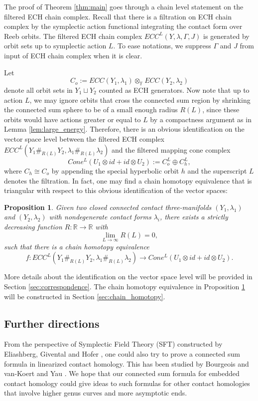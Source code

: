 \documentclass{article}
\numberwithin{equation}{section}
\newtheorem{proposition}[theorem]{Proposition}
\theoremstyle{definition}
\newcommand{\R}{\mathbb{R}}
\newcommand{\F}{\mathbb{F}}
\begin{document}
The proof of Theorem \ref{thm:main} goes through a chain level statement on the filtered ECH chain complex. Recall that there is a filtration on ECH chain complex by the symplectic action functional integrating the contact form over Reeb orbits. The filtered ECH chain complex $ECC^L(Y,\lambda, \Gamma, J)$ is generated by orbit sets up to symplectic action $L$. To ease notations, we suppress $\Gamma$ and $J$ from input of ECH chain complex when it is clear. 

Let
$$C_o:= ECC(Y_1, \lambda_1) \otimes_{\F} ECC(Y_2, \lambda_2)$$ 
denote all orbit sets in $Y_1 \sqcup Y_2$ counted as ECH generators. Now note that up to action $L$, we may ignore orbits that cross the connected sum region by shrinking the connected sum sphere to be of a small enough radius $R(L)$, since these orbits would have actions greater or equal to $L$ by a compactness argument as in Lemma \ref{lem:large_energy}. Therefore, there is an obvious identification on the vector space level between the filtered ECH complex $ECC^L(Y_1 \#_{R(L)} Y_2, \lambda_1\#_{R(L)}\lambda_2)$ and the filtered mapping cone complex 
$$Cone^L(U_1 \otimes id + id \otimes U_2):=C_o^L \oplus C_h^L,$$
where $C_h \cong C_o$ by appending the special hyperbolic orbit $h$ and the superscript $L$ denotes the filtration. In fact, one may find a chain homotopy equivalence that is triangular with respect to this obvious identification of the vector spaces:

\begin{proposition}
\label{prop:main_filtered_intro}
Given two closed connected contact three-manifolds $(Y_1, \lambda_1)$ and $(Y_2, \lambda_2)$ with nondegenerate contact forms $\lambda_i$, there exists a strictly decreasing function $R: \R \to \R$ with $$\lim_{L\to \infty} R(L) = 0,$$
such that there is a chain homotopy equivalence 
$$f: ECC^L(Y_1 \#_{R(L)} Y_2, \lambda_1\#_{R(L)}\lambda_2) \longrightarrow Cone^L(U_1 \otimes id + id \otimes U_2).$$
\end{proposition}


More details about the identification on the vector space level will be provided in Section \ref{sec:correspondence}. The chain homotopy equivalence in Proposition \ref{prop:main_filtered_intro} will be constructed in Section \ref{sec:chain_homotopy}.


\subsection{Further directions}
\label{sec:future}
From the perspective of Symplectic Field Theory (SFT) constructed by Eliashberg, Givental and Hofer \cite{EGH}, one could also try to prove a connected sum formula in linearized contact homology. This has been studied by Bourgeois and van-Koert \cite{BVK} and Yau \cite{Yau}. We hope that our connected sum formula for embedded contact homology could give ideas to such formulas for other contact homologies that involve higher genus curves and more asymptotic ends.
\end{document}
